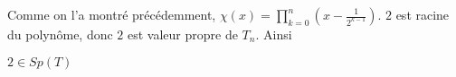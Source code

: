 Comme on l'a montré précédemment, $\chi(x) = \prod_{k=0}^{n} \left(x-\frac{1}{2^{k-1}}\right)$. $2$ est racine du polynôme, donc $2$ est valeur propre de $T_n$. Ainsi
\begin{result}
  $2 \in Sp(T)$
\end{result}
